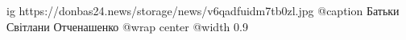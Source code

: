  
 
 
 
 

\ifcmt
  ig https://donbas24.news/storage/news/v6qadfuidm7tb0zl.jpg
	@caption Батьки Світлани Отченашенко
  @wrap center
  @width 0.9
\fi
